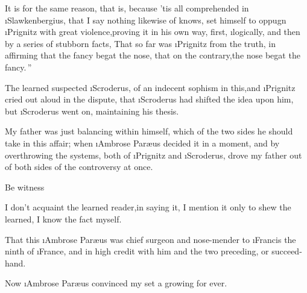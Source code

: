 \documentclass[twoside]{article}
\begin{document}
It is for the same reason, that is, because ’tis all
comprehended in \i{Slawkenbergius}, that I say nothing likewise
of  knows, set himself
to oppugn \i{Prignitz} with great violence,\tsk proving it in
his own way, first, \i{logically}, and then by\break
a series of stubborn facts, \lqq That so far\break
was \i{Prignitz} from the truth, in affirming 
that the fancy begat the nose, that on the 
contrary,\tsk the nose begat the fancy.\,”

\tsk The learned suspected \i{Scroderus}, of an indecent
sophism in this,\tsk and \i{Prignitz} cried out aloud in the
dispute, that \i{Scroderus} had shifted the idea upon
him,
\tsk but \i{Scroderus} went on, maintaining his
thesis.\tsh

My father was just balancing within himself, which of the
two sides he should take in this affair; when
\i{Ambrose Paræus} decided it in a moment, and by
overthrowing the systems, both of \i{Prignitz} and
\i{Scroderus}, drove my father out of both sides of the
controversy at once.

Be witness\tsh

I don’t acquaint the learned reader,\tsk in saying it, I
mention it only to shew the learned, I know the fact
myself.\tsh

That this \i{Ambrose Paræus} was chief surgeon and
nose-mender to \i{Francis} the ninth of
\i{France}, and in high credit with him and the two
preceding, or succeed-
hand.

Now \i{Ambrose Paræus} convinced my 
set a growing for ever.
\end{document}
